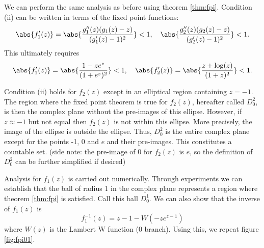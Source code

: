 \documentclass{book}
\begin{document}
We can perform the same analysis as before using theorem \ref{thm:fpi}.
Condition (ii) can be written in terms of the fixed point functions:
\begin{equation*}
\abs{f_1'(z)} = \abs{ \frac{ g_1''(z) (g_1(z) - z) }{ (g_1'(z) - 1)^2 } } < 1, \quad \abs{ \frac{ g_2''(z) (g_2(z) - z) }{ (g_2'(z) - 1)^2 } } < 1 .
\end{equation*}
This ultimately requires
\begin{equation*}
\abs{f_1'(z)} = \abs{ \frac{1 - z e^z}{(1 + e^z)^2} } < 1, \quad \abs{f_2'(z)} = \abs{ \frac{z + \log(z)}{(1 + z)^2} } < 1.
\end{equation*}

Condition (ii) holds for $f_2(z)$ except in an elliptical region containing $z=-1$.
The region where the fixed point theorem is true for $f_2(z)$, hereafter called $D_0^2$, is then the complex plane without the pre-images of this ellipse.
However, if $z \approx -1$ but not equal then $f_2(z)$ is not within this ellipse.
More precisely, the image of the ellipse is outside the ellipse.
Thus, $D_0^2$ is the entire complex plane except for the points -1, 0 and $e$ and their pre-images.
This constitutes a countable set.
(side note: the pre-image of 0 for $f_2(z)$ is $e$, so the definition of $D_0^2$ can be further simplified if desired)

Analysis for $f_1(z)$ is carried out numerically.
Through experiments we can establish that the ball of radius 1 in the complex plane represents a region where theorem \ref{thm:fpi} is satisfied.
Call this ball $D_0^1$.
We can also show that the inverse of $f_1(z)$ is
\begin{equation*}
f_1^{-1}(z) = z - 1 - W(-z e^{z-1})
\end{equation*}
where $W(z)$ is the Lambert W function (0 branch).
Using this, we repeat figure \ref{fig:fpi01}.
\end{document}
